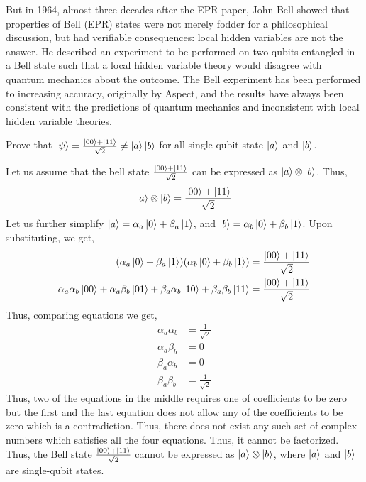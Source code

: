 But in 1964, almost three decades after the EPR paper, John Bell showed that properties of Bell (EPR) states were not merely fodder for a philosophical discussion, but had verifiable consequences: local hidden variables are not the answer. He described an experiment to be performed on two qubits entangled in a Bell state such that a local hidden variable theory would disagree with quantum mechanics about the outcome. The Bell experiment has been performed to increasing accuracy, originally by Aspect, and the results have always been consistent with the predictions of quantum mechanics and inconsistent with local hidden variable theories.
\begin{example}
    Prove that $\ket{\psi}=\frac{\ket{00}+\ket{11}}{\sqrt{2}}\neq \ket{a}\ket{b}$ for all single qubit state $\ket{a}$ and $\ket{b}$.

    Let us assume that the bell state $\frac{\ket{00}+\ket{11}}{\sqrt{2}}$ can be expressed as $\ket{a} \otimes \ket{b}$. Thus,
\[
\ket{a}\otimes \ket{b}=\frac{\ket{00}+\ket{11}}{\sqrt{2}}
\]
Let us further simplify $\ket{a}=\alpha_a\ket{0}+\beta_a\ket{1}$, and $\ket{b}=\alpha_b\ket{0}+\beta_b\ket{1}$. Upon substituting, we get,
\begin{align*}
(\alpha_a\ket{0}+\beta_a\ket{1})(\alpha_b\ket{0}+\beta_b\ket{1})&=\frac{\ket{00}+\ket{11}}{\sqrt{2}}\\
\alpha_a\alpha_b\ket{00}+\alpha_a\beta_b\ket{01}+\beta_a\alpha_b\ket{10}+\beta_a\beta_b\ket{11}&=\frac{\ket{00}+\ket{11}}{\sqrt{2}}
\end{align*}
Thus, comparing equations we get,
\begin{align*}
\alpha_a\alpha_b&=\frac{1}{\sqrt{2}}\\
\alpha_a\beta_b&=0\\
\beta_a\alpha_b&=0\\
\beta_a\beta_b&=\frac{1}{\sqrt{2}}
\end{align*}
Thus, two of the equations in the middle requires one of coefficients to be zero but the first and the last equation does not allow any of the coefficients to be zero which is a contradiction. Thus, there does not exist any such set of complex numbers which satisfies all the four equations. Thus, it cannot be factorized. Thus, the Bell state $\frac{\ket{00}+\ket{11}}{\sqrt{2}}$ cannot be expressed as $\ket{a} \otimes \ket{b}$, where $\ket{a}$ and $\ket{b}$ are single-qubit states.
\end{example}
